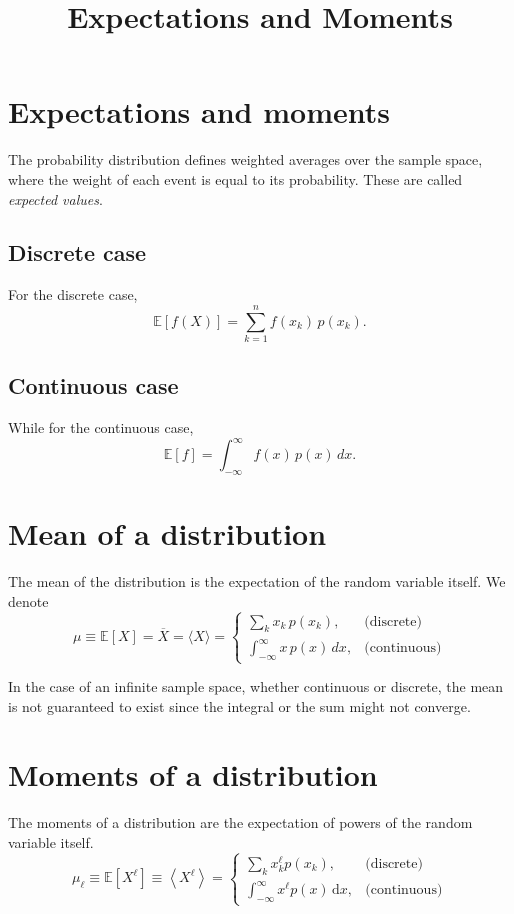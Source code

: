 \documentclass{article}
\title{Expectations and Moments}
\author{}
\begin{document}
\maketitle

\section*{Expectations and moments}
The probability distribution defines weighted averages over the sample space, where the weight of each event is equal to its probability. These are called \emph{expected values}.

\subsection*{Discrete case}
For the discrete case,
\[
\mathbb{E}[f(X)] = \sum_{k=1}^n f(x_k)\,p(x_k).
\]

\subsection*{Continuous case}
While for the continuous case,
\[
\mathbb{E}[f] = \int_{-\infty}^{\infty} f(x)\,p(x)\,dx.
\]


\section*{Mean of a distribution}
The mean of the distribution is the expectation of the random variable itself. We denote
\[
\mu \equiv \mathbb{E}[X] = \overline{X} = \langle X \rangle =
\begin{cases}
\displaystyle \sum_k x_k\,p(x_k), & \text{(discrete)}\\[6pt]
\displaystyle \int_{-\infty}^{\infty} x\,p(x)\,dx, & \text{(continuous)}
\end{cases}
\]

In the case of an infinite sample space, whether continuous or discrete, the mean is not guaranteed to exist since the integral or the sum might not converge.

\section*{Moments of a distribution}
The moments of a distribution are the expectation of powers of the random variable itself.
\[
\mu_\ell \equiv \mathbb{E}\left[X^\ell\right] \equiv \left\langle X^\ell \right\rangle = 
\begin{cases} 
\displaystyle\sum_k x_k^\ell p(x_k), & \text{(discrete)}\\[6pt]
\displaystyle\int_{-\infty}^{\infty} x^\ell p(x) \,\mathrm{d}x, & \text{(continuous)}
\end{cases}
\]
\end{document}
